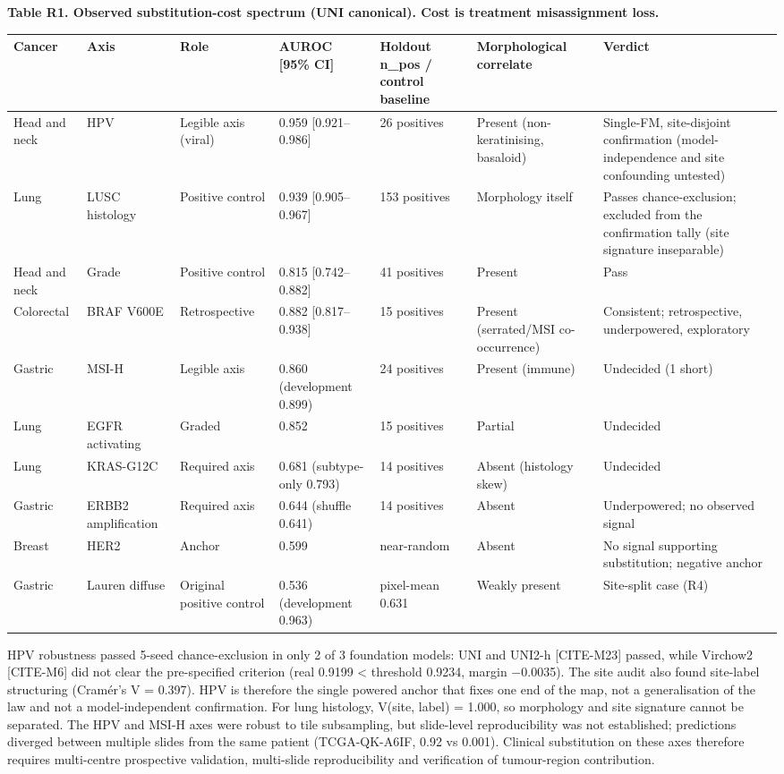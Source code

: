 \textbf{Table R1. Observed substitution-cost spectrum (UNI canonical). Cost is treatment misassignment loss.}

\begin{table}[ht]\centering\footnotesize
\begin{tabular}{lllllll}\hline
Cancer & Axis & Role & AUROC [95\% CI] & Holdout n\_pos / control baseline & Morphological correlate & Verdict \\\hline
Head and neck & HPV & Legible axis (viral) & 0.959 [0.921--0.986] & 26 positives & Present (non-keratinising, basaloid) & Single-FM, site-disjoint confirmation (model-independence and site confounding untested) \\
Lung & LUSC histology & Positive control & 0.939 [0.905--0.967] & 153 positives & Morphology itself & Passes chance-exclusion; excluded from the confirmation tally (site signature inseparable) \\
Head and neck & Grade & Positive control & 0.815 [0.742--0.882] & 41 positives & Present & Pass \\
Colorectal & BRAF V600E & Retrospective & 0.882 [0.817--0.938] & 15 positives & Present (serrated/MSI co-occurrence) & Consistent; retrospective, underpowered, exploratory \\
Gastric & MSI-H & Legible axis & 0.860 (development 0.899) & 24 positives & Present (immune) & Undecided (1 short) \\
Lung & EGFR activating & Graded & 0.852 & 15 positives & Partial & Undecided \\
Lung & KRAS-G12C & Required axis & 0.681 (subtype-only 0.793) & 14 positives & Absent (histology skew) & Undecided \\
Gastric & ERBB2 amplification & Required axis & 0.644 (shuffle 0.641) & 14 positives & Absent & Underpowered; no observed signal \\
Breast & HER2 & Anchor & 0.599 & near-random & Absent & No signal supporting substitution; negative anchor \\
Gastric & Lauren diffuse & Original positive control & 0.536 (development 0.963) & pixel-mean 0.631 & Weakly present & Site-split case (R4) \\
\hline\end{tabular}\end{table}

HPV robustness passed 5-seed chance-exclusion in only 2 of 3 foundation models: UNI and UNI2-h [CITE-M23] passed, while Virchow2 [CITE-M6] did not clear the pre-specified criterion (real 0.9199 < threshold 0.9234, margin $-$0.0035). The site audit also found site-label structuring (Cram\'er's V = 0.397). HPV is therefore the single powered anchor that fixes one end of the map, not a generalisation of the law and not a model-independent confirmation. For lung histology, V(site, label) = 1.000, so morphology and site signature cannot be separated. The HPV and MSI-H axes were robust to tile subsampling, but slide-level reproducibility was not established; predictions diverged between multiple slides from the same patient (TCGA-QK-A6IF, 0.92 vs 0.001). Clinical substitution on these axes therefore requires multi-centre prospective validation, multi-slide reproducibility and verification of tumour-region contribution.

